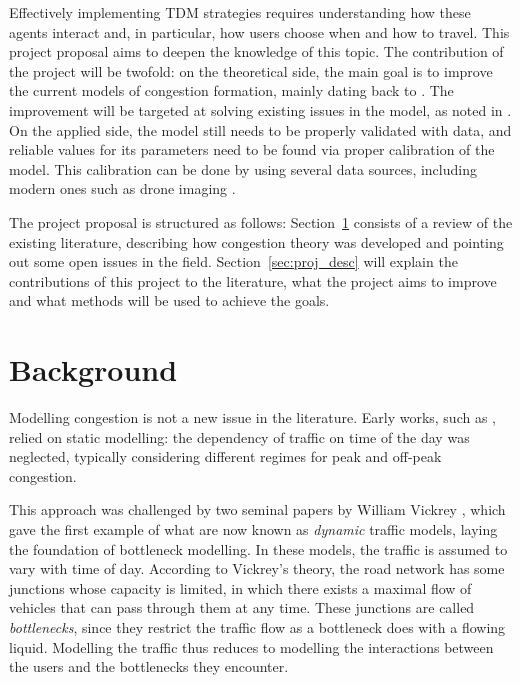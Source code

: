 \documentclass{article}
\begin{document}
Effectively implementing TDM strategies requires understanding how these agents interact and,
in particular, how users choose when and how to travel.
This project proposal aims to deepen the knowledge of this topic.
The contribution of the project will be twofold:
on the theoretical side, the main goal is to improve the current models of congestion formation,
mainly dating back to \textcite{d0907f84-e14a-3d98-ad20-759f41491d6e}.
The improvement will be targeted at solving existing issues in the model,
as noted in \textcite{https://doi.org/10.1111/iere.12692}.
On the applied side, the model still needs to be properly validated with data,
and reliable values for its parameters need to be found via proper calibration of the model.
This calibration can be done by using several data sources,
including modern ones such as drone imaging \parencite{fonod2025songdo}.

The project proposal is structured as follows:
Section~\ref{sec:lit} consists of a review of the existing literature,
describing how congestion theory was developed and pointing out some open issues in the field.
Section~\ref{sec:proj_desc} will explain the contributions of this project to the literature,
what the project aims to improve and what methods will be used to achieve the goals.

\section{Background}
\label{sec:lit}

Modelling congestion is not a new issue in the literature.
Early works, such as \textcite{Jorgensen1947},
relied on static modelling:
the dependency of traffic on time of the day was neglected,
typically considering different regimes for peak and off-peak congestion.

This approach was challenged by two seminal papers by William Vickrey \parencite{Vickrey1963, Vickrey1969},
which gave the first example of what are now known as \textit{dynamic} traffic models,
laying the foundation of bottleneck modelling.
In these models, the traffic is assumed to vary with time of day.
According to Vickrey's theory,
the road network has some junctions whose capacity is limited,
in which there exists a maximal flow of vehicles that can pass through them at any time.
These junctions are called \textit{bottlenecks}, since they restrict the traffic flow as a bottleneck does with a flowing liquid.
Modelling the traffic thus reduces to modelling the interactions between the users and the bottlenecks they encounter.
\end{document}

